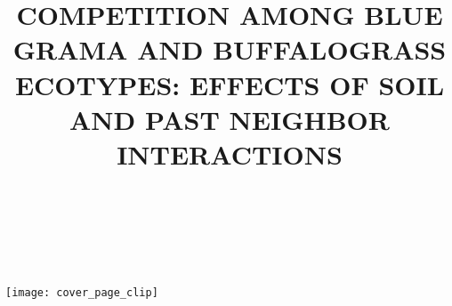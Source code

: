 \documentclass[fleqn]{class/Moffetttuthes}
\title{\MakeUppercase{Competition Among Blue Grama and Buffalograss
Ecotypes: Effects of Soil and Past Neighbor Interactions}}
\author{%
{\ }}  %
\date{%
{\ }}  %
\begin{document}
\maketitle
\begin{center}
\pagestyle{empty}
\texttt{[image: cover\_page\_clip]}
\end{center}

\frontmatter



\tableofcontents



\listoftables
\listoffigures


\mainmatter







\begin{singlespace}
  
\end{singlespace}
\end{document}
